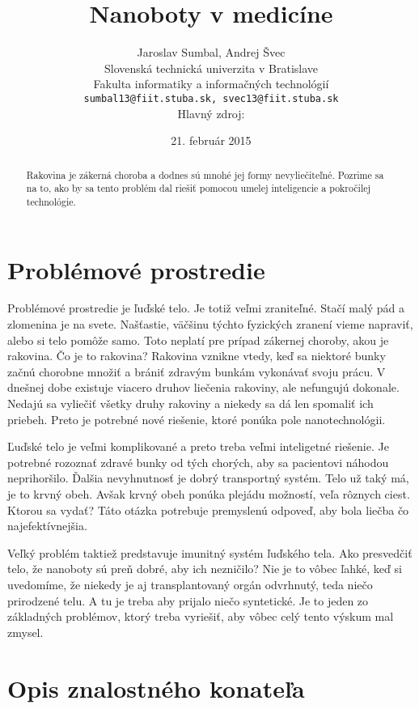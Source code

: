 \documentclass[10pt,twoside,slovak,a4paper]{article}
\title{Nanoboty v medicíne}
\author{Jaroslav Sumbal, Andrej Švec\\[2pt]
	{\small Slovenská technická univerzita v Bratislave}\\
	{\small Fakulta informatiky a informačných technológií}\\
	{\small \texttt{sumbal13@fiit.stuba.sk, svec13@fiit.stuba.sk}}\\
	{\small Hlavný zdroj: \cite{Zdroj}}
	}
\date{\small 21. február 2015} %
\begin{document}
\maketitle


\begin{abstract}
Rakovina je zákerná choroba a dodnes sú mnohé jej formy nevyliečiteľné. Pozrime sa na to, ako by sa tento problém dal riešiť pomocou umelej inteligencie a pokročilej technológie.

\end{abstract}

\section{Problémové prostredie}

Problémové prostredie je ľuďské telo. Je totiž veľmi zraniteľné. Stačí malý pád a zlomenina je na svete. Našťastie, väčšinu týchto fyzických zranení vieme napraviť, alebo si telo pomôže samo. Toto neplatí pre prípad zákernej choroby, akou je rakovina. Čo je to rakovina? Rakovina vznikne vtedy, keď sa niektoré bunky začnú chorobne množiť a brániť zdravým bunkám vykonávať svoju prácu. V dnešnej dobe existuje viacero druhov liečenia rakoviny, ale nefungujú dokonale. Nedajú sa vyliečiť všetky druhy rakoviny a niekedy sa dá len spomaliť ich priebeh. Preto je potrebné nové riešenie, ktoré ponúka pole nanotechnológii.

Ľuďské telo je veľmi komplikované a preto treba veľmi inteligetné riešenie. Je potrebné rozoznať zdravé bunky od tých chorých, aby sa pacientovi náhodou neprihoršilo. Ďalšia nevyhnutnosť je dobrý transportný systém. Telo už taký má, je to krvný obeh. Avšak krvný obeh ponúka plejádu možností, veľa rôznych ciest. Ktorou sa vydať? Táto otázka potrebuje premyslenú odpoveď, aby bola liečba čo najefektívnejšia.

Veľký problém taktiež predstavuje imunitný systém ľuďského tela. Ako presvedčiť telo, že nanoboty sú preň dobré, aby ich nezničilo? Nie je to vôbec ľahké, keď si uvedomíme, že niekedy je aj transplantovaný orgán odvrhnutý, teda niečo prirodzené telu. A tu je treba aby prijalo niečo syntetické. Je to jeden zo základných problémov, ktorý treba vyriešiť, aby vôbec celý tento výskum mal zmysel.

\section{Opis znalostného konateľa}
\end{document}
